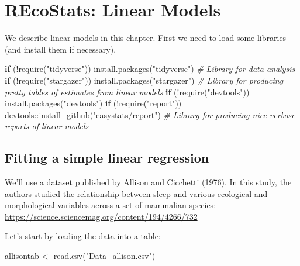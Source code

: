 \documentclass[
]{book}
\newenvironment{Shaded}{\begin{snugshade}}{\end{snugshade}}
\newcommand{\CommentTok}[1]{\textcolor[rgb]{0.56,0.35,0.01}{\textit{#1}}}
\newcommand{\ControlFlowTok}[1]{\textcolor[rgb]{0.13,0.29,0.53}{\textbf{#1}}}
\newcommand{\FunctionTok}[1]{\textcolor[rgb]{0.00,0.00,0.00}{#1}}
\newcommand{\NormalTok}[1]{#1}
\newcommand{\OtherTok}[1]{\textcolor[rgb]{0.56,0.35,0.01}{#1}}
\newcommand{\SpecialCharTok}[1]{\textcolor[rgb]{0.00,0.00,0.00}{#1}}
\newcommand{\StringTok}[1]{\textcolor[rgb]{0.31,0.60,0.02}{#1}}
\begin{document}
\hypertarget{recostats-linear-models}{%
\chapter{REcoStats: Linear Models}\label{recostats-linear-models}}

We describe linear models in this chapter. First we need to load some libraries (and install them if necessary).

\begin{Shaded}
\begin{Highlighting}[]
\ControlFlowTok{if}\NormalTok{ (}\SpecialCharTok{!}\FunctionTok{require}\NormalTok{(}\StringTok{"tidyverse"}\NormalTok{)) }\FunctionTok{install.packages}\NormalTok{(}\StringTok{"tidyverse"}\NormalTok{) }\CommentTok{\# Library for data analysis}
\ControlFlowTok{if}\NormalTok{ (}\SpecialCharTok{!}\FunctionTok{require}\NormalTok{(}\StringTok{"stargazer"}\NormalTok{)) }\FunctionTok{install.packages}\NormalTok{(}\StringTok{"stargazer"}\NormalTok{) }\CommentTok{\# Library for producing pretty tables of estimates from linear models}
\ControlFlowTok{if}\NormalTok{ (}\SpecialCharTok{!}\FunctionTok{require}\NormalTok{(}\StringTok{"devtools"}\NormalTok{)) }\FunctionTok{install.packages}\NormalTok{(}\StringTok{"devtools"}\NormalTok{)}
\ControlFlowTok{if}\NormalTok{ (}\SpecialCharTok{!}\FunctionTok{require}\NormalTok{(}\StringTok{"report"}\NormalTok{)) devtools}\SpecialCharTok{::}\FunctionTok{install\_github}\NormalTok{(}\StringTok{"easystats/report"}\NormalTok{) }\CommentTok{\# Library for producing nice verbose reports of linear models}
\end{Highlighting}
\end{Shaded}

\hypertarget{fitting-a-simple-linear-regression-1}{%
\section{Fitting a simple linear regression}\label{fitting-a-simple-linear-regression-1}}

We'll use a dataset published by Allison and Cicchetti (1976). In this study, the authors studied the relationship between sleep and various ecological and morphological variables across a set of mammalian species:
\url{https://science.sciencemag.org/content/194/4266/732}

Let's start by loading the data into a table:

\begin{Shaded}
\begin{Highlighting}[]
\NormalTok{allisontab }\OtherTok{\textless{}{-}} \FunctionTok{read.csv}\NormalTok{(}\StringTok{"Data\_allison.csv"}\NormalTok{)}
\end{Highlighting}
\end{Shaded}
\end{document}
